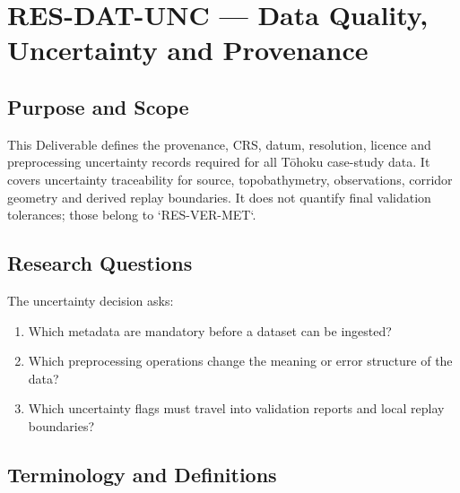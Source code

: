 
\section{RES-DAT-UNC --- Data Quality, Uncertainty and Provenance}
\label{sec:res-dat-unc}

\subsection{Purpose and Scope}
\label{sec:res-dat-unc-purpose}

This Deliverable defines the provenance, CRS, datum, resolution,
licence and preprocessing uncertainty records required for all Tōhoku
case-study data. It covers uncertainty traceability for source,
topobathymetry, observations, corridor geometry and derived replay
boundaries. It does not quantify final validation tolerances; those
belong to `RES-VER-MET`.

\subsection{Research Questions}
\label{sec:res-dat-unc-research-questions}

The uncertainty decision asks:

\begin{enumerate}
  \item Which metadata are mandatory before a dataset can be ingested?
  \item Which preprocessing operations change the meaning or error
    structure of the data?
  \item Which uncertainty flags must travel into validation reports and
    local replay boundaries?
\end{enumerate}

\subsection{Terminology and Definitions}
\label{sec:res-dat-unc-definitions}

